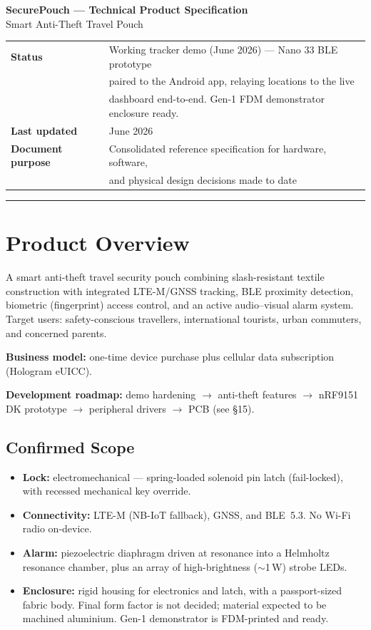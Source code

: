\documentclass[11pt,a4paper]{article}
\begin{document}
\begin{center}
{\LARGE\bfseries SecurePouch --- Technical Product Specification}\\[0.6em]
{\large Smart Anti-Theft Travel Pouch}\\[1.2em]
\begin{tabular}{ll}
\textbf{Status} & Working tracker demo (June 2026) --- Nano 33 BLE prototype\\
& paired to the Android app, relaying locations to the live\\
& dashboard end-to-end. Gen-1 FDM demonstrator enclosure ready.\\
\textbf{Last updated} & June 2026\\
\textbf{Document purpose} & Consolidated reference specification for hardware, software,\\
& and physical design decisions made to date\\
\end{tabular}
\end{center}

\vspace{0.5em}
\hrule
\vspace{0.5em}

\section{Product Overview}

A smart anti-theft travel security pouch combining slash-resistant textile construction with integrated LTE-M/GNSS tracking, BLE proximity detection, biometric (fingerprint) access control, and an active audio--visual alarm system. Target users: safety-conscious travellers, international tourists, urban commuters, and concerned parents.

\textbf{Business model:} one-time device purchase plus cellular data subscription (Hologram eUICC).

\textbf{Development roadmap:} demo hardening $\rightarrow$ anti-theft features $\rightarrow$ nRF9151 DK prototype $\rightarrow$ peripheral drivers $\rightarrow$ PCB (see \S15).

\subsection{Confirmed Scope}

\begin{itemize}
  \item \textbf{Lock:} electromechanical --- spring-loaded solenoid pin latch (fail-locked), with recessed mechanical key override.
  \item \textbf{Connectivity:} LTE-M (NB-IoT fallback), GNSS, and BLE~5.3. No Wi-Fi radio on-device.
  \item \textbf{Alarm:} piezoelectric diaphragm driven at resonance into a Helmholtz resonance chamber, plus an array of high-brightness ($\sim$1\,W) strobe LEDs.
  \item \textbf{Enclosure:} rigid housing for electronics and latch, with a passport-sized fabric body. Final form factor is not decided; material expected to be machined aluminium. Gen-1 demonstrator is FDM-printed and ready.
\end{itemize}
\end{document}
